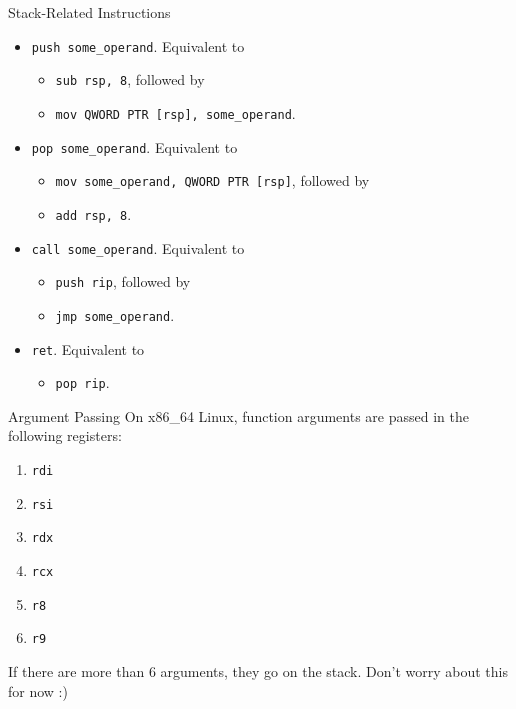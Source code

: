 \documentclass[hyphens,aspectratio=169]{beamer}
\begin{document}
\begin{frame}[fragile]{Stack-Related Instructions}
    \begin{itemize}
        \pause \item \texttt{push some\_operand}. Equivalent to
            \begin{itemize}
                \pause \item \texttt{sub rsp, 8}, followed by
                \pause \item \texttt{mov QWORD PTR [rsp], some\_operand}.
            \end{itemize}
        \pause \item \texttt{pop some\_operand}. Equivalent to
            \begin{itemize}
                \pause \item \texttt{mov some\_operand, QWORD PTR [rsp]}, followed by
                \pause \item \texttt{add rsp, 8}.
            \end{itemize}
        \pause \item \texttt{call some\_operand}. Equivalent to
            \begin{itemize}
                \pause \item \texttt{push rip}, followed by %
                \pause \item \texttt{jmp some\_operand}.
            \end{itemize}
        \pause \item \texttt{ret}. Equivalent to
            \begin{itemize}
                \pause \item \texttt{pop rip}. %
            \end{itemize}
    \end{itemize}
\end{frame}

\begin{frame}[fragile]{Argument Passing}
    On x86\_64 Linux, function arguments are passed in the following registers:
    \begin{enumerate}
        \pause \item \texttt{rdi}
        \pause \item \texttt{rsi}
        \pause \item \texttt{rdx}
        \pause \item \texttt{rcx}
        \pause \item \texttt{r8}
        \pause \item \texttt{r9}
    \end{enumerate}

    \pause If there are more than 6 arguments, they go on the stack.
    Don't worry about this for now :)
\end{frame}
\end{document}
